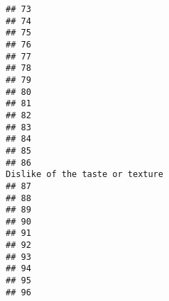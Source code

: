 \documentclass[
]{article}
\begin{document}
\begin{verbatim}
## 73                                                                                                         
## 74                                                                                                         
## 75                                                                                                         
## 76                                                                                                         
## 77                                                                                                         
## 78                                                                                                         
## 79                                                                                                         
## 80                                                                                                         
## 81                                                                                                         
## 82                                                                                                         
## 83                                                                                                         
## 84                                                                                                         
## 85                                                                                                         
## 86                                                                          Dislike of the taste or texture
## 87                                                                                                         
## 88                                                                                                         
## 89                                                                                                         
## 90                                                                                                         
## 91                                                                                                         
## 92                                                                                                         
## 93                                                                                                         
## 94                                                                                                         
## 95                                                                                                         
## 96                                                                                                         

\end{verbatim}
\end{document}
